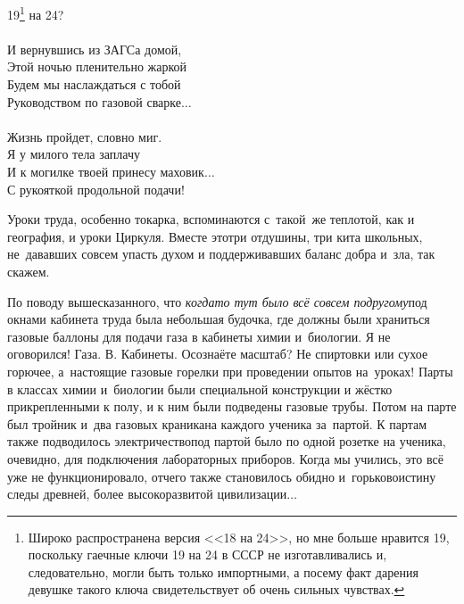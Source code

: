 {\hspace*{2.7cm}19\footnote[1]{Широко распространена версия <<18 на 24>>, но мне больше нравится 19, поскольку гаечные ключи 19 на 24 в СССР не изготавливались и, следовательно, могли быть только импортными, а посему факт дарения девушке такого ключа свидетельствует об очень сильных чувствах.} на 24?\\
\\
\hspace*{2.7cm}И вернувшись из ЗАГСа домой,\\
\hspace*{2.7cm}Этой ночью пленительно жаркой\\
\hspace*{2.7cm}Будем мы наслаждаться с тобой\\
\hspace*{2.7cm}Руководством по газовой сварке$\ldots$\\
\\
\hspace*{2.7cm}Жизнь пройдет, словно миг.\\
\hspace*{2.7cm}Я у милого тела заплачу\\
\hspace*{2.7cm}И к могилке твоей принесу маховик$\ldots$\\
\hspace*{2.7cm}С рукояткой продольной подачи!\\ 
}
\vspace{0.5cm}

Уроки труда, особенно токарка, вспоминаются с~такой~же теплотой, как и география, и уроки Циркуля. Вместе это\mdash три отдушины, три кита школьных, не~дававших совсем упасть духом и поддерживавших баланс добра и~зла, так скажем. 

По поводу вышесказанного, что \textit{когда\sdash то тут было всё совсем по\sdash другому}\mdash под окнами кабинета труда была небольшая будочка, где должны были храниться газовые баллоны для подачи газа в кабинеты химии и~биологии. Я не оговорился! Газа. В. Кабинеты. Осознаёте масштаб? Не спиртовки или сухое горючее, а~настоящие газовые горелки при проведении опытов на~уроках! Парты в классах химии и~биологии были специальной конструкции и жёстко прикрепленными к полу, и к ним были подведены газовые трубы. Потом на парте был тройник и~два газовых краника\mdash на каждого ученика за~партой. К партам также подводилось электричество\mdash под партой было по одной розетке на ученика, очевидно, для подключения лабораторных приборов. Когда мы учились, это всё уже не функционировало, отчего также становилось обидно и~горько\mdash воистину следы древней, более высокоразвитой цивилизации$\ldots$


